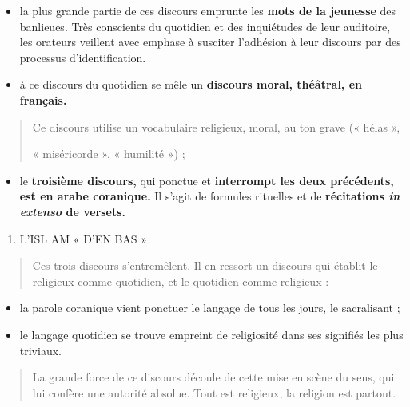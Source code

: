 \begin{itemize}
\item
  la plus grande partie de ces discours emprunte les \textbf{mots de la
  jeunesse} des banlieues. Très conscients du quotidien et des
  inquiétudes de leur auditoire, les orateurs veillent avec emphase à
  susciter l'adhésion à leur discours par des processus
  d'identification.
\item
  à ce discours du quotidien se mêle un \textbf{discours moral,
  théâtral, en français.}
\end{itemize}

\begin{quote}
Ce discours utilise un vocabulaire religieux, moral, au ton grave («
hélas »,

« miséricorde », « humilité ») ;
\end{quote}

\begin{itemize}
\item
  le \textbf{troisième discours,} qui ponctue et \textbf{interrompt les
  deux précédents, est en arabe coranique.} Il s'agit de formules
  rituelles et de \textbf{récitations \emph{in extenso} de versets.}
\end{itemize}

\begin{enumerate}
\def\labelenumi{\Roman{enumi}.}
\setcounter{enumi}{2}
\item
  L'ISL AM « D'EN BAS »
\end{enumerate}

\begin{quote}
Ces trois discours s'entremêlent. Il en ressort un discours qui établit
le religieux comme quotidien, et le quotidien comme religieux :
\end{quote}

\begin{itemize}
\item
  la parole coranique vient ponctuer le langage de tous les jours, le
  sacralisant ;
\item
  le langage quotidien se trouve empreint de religiosité dans ses
  signifiés les plus triviaux.
\end{itemize}

\begin{quote}
La grande force de ce discours découle de cette mise en scène du sens,
qui lui confère une autorité absolue. Tout est religieux, la religion
est partout.
\end{quote}

